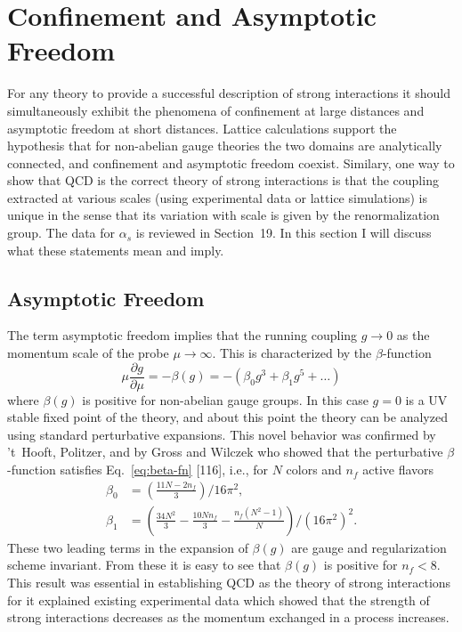 
\chapter{Confinement and Asymptotic Freedom}

For any theory to provide a successful description of strong interactions
it should simultaneously exhibit the phenomena of confinement at large
distances and asymptotic freedom at short distances. Lattice calculations
support the hypothesis that for non-abelian gauge theories the two domains
are analytically connected, and confinement and asymptotic freedom
coexist. Similary, one way to show that QCD is the correct theory of
strong interactions is that the coupling extracted at various scales (using
experimental data or lattice simulations) is unique in the sense that its
variation with scale is given by the renormalization group. The data for
$\alpha_s$ is reviewed in Section~19. In this section I will discuss what
these statements mean and imply.

\section{Asymptotic Freedom}
\label{sec:asymptotic-freedom}

The term asymptotic freedom implies that the running coupling $g \to 0$ as
the momentum scale of the probe $\mu \to \infty$. This is characterized by
the $\beta$-function
\begin{equation}
  \mu\frac{\partial g}{\partial\mu}
  = -\beta(g) = -(\beta_0 g^3 + \beta_1 g^5 + \ldots)
  \label{eq:beta-fn}
\end{equation}
where $\beta(g)$ is positive for non-abelian gauge groups. In this case
$g = 0$ is a UV stable fixed point of the theory, and about this point the
theory can be analyzed using standard perturbative expansions. This novel
behavior was confirmed by 't~Hooft, Politzer, and by Gross and Wilczek who
showed that the perturbative $\beta$-function satisfies
Eq.~\eqref{eq:beta-fn} [116], i.e., for $N$ colors and $n_f$ active
flavors
\begin{equation}
  \begin{aligned}
    \beta_0 &= \left(\frac{11N - 2n_f}{3}\right)\!/16\pi^2, \\
    \beta_1 &= \left(\frac{34N^2}{3} - \frac{10N n_f}{3}
               - \frac{n_f(N^2-1)}{N}\right)\!/(16\pi^2)^2.
  \end{aligned}
  \label{eq:beta-coeffs}
\end{equation}
These two leading terms in the expansion of $\beta(g)$ are gauge and
regularization scheme invariant. From these it is easy to see that $\beta(g)$
is positive for $n_f < 8$. This result was essential in establishing QCD as
the theory of strong interactions for it explained existing experimental
data which showed that the strength of strong interactions decreases as the
momentum exchanged in a process increases.

